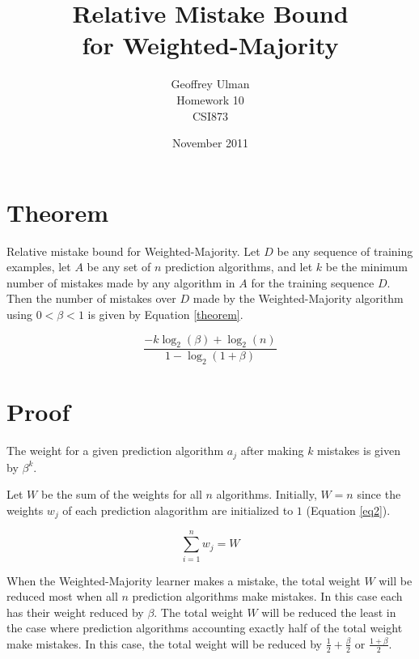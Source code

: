 \documentclass{article}
\begin{document}
\title{Relative Mistake Bound\\
       for Weighted-Majority}
\author{Geoffrey Ulman\\
        Homework 10\\
        CSI873}
\date{November 2011}
\maketitle

\section{Theorem}\label{Theorem}

Relative mistake bound for Weighted-Majority. Let \(D\) be any sequence of training examples, let \(A\) be any set of \(n\) prediction algorithms, and let \(k\) be the minimum number of mistakes made by any algorithm in \(A\) for the training sequence \(D\). Then the number of mistakes over \(D\) made by the Weighted-Majority algorithm using \(0 < \beta < 1\) is given by Equation \ref{theorem}.

\begin{equation}\label{theorem}
\frac{-k \log _2 \left( \beta \right) + \log _2 \left( n \right)}{1 - \log _2 \left( 1 + \beta \right)}
\end{equation}

\section{Proof}\label{Proof}

The weight for a given prediction algorithm \(a_j\) after making \(k\) mistakes is given by \(\beta^k\).

Let \(W\) be the sum of the weights for all \(n\) algorithms. Initially, \(W=n\) since the weights \(w_j\) of each prediction alagorithm are initialized to \(1\) (Equation \ref{eq2}).

\begin{equation}\label{eq2}
\sum_{i=1}^{n} w_{j} = W
\end{equation}

When the Weighted-Majority learner makes a mistake, the total weight \(W\) will be reduced most when all \(n\) prediction algorithms make mistakes. In this case each has their weight reduced by \(\beta\). The total weight \(W\) will be reduced the least in the case where prediction algorithms accounting exactly half of the total weight make mistakes. In this case, the total weight will be reduced by \( \frac{1}{2}+\frac{\beta}{2} \) or \( \frac{1 + \beta}{2} \).
\end{document}
